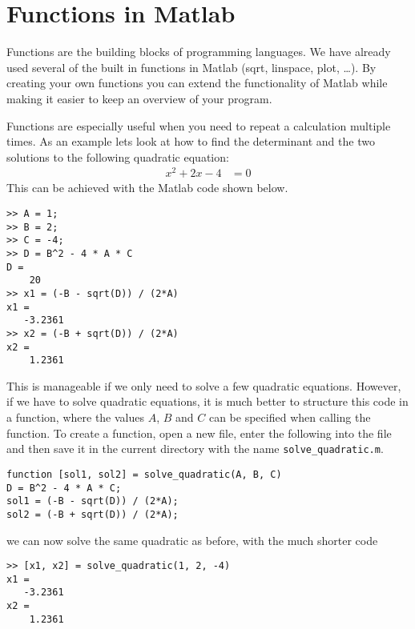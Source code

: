 \section{Functions in Matlab}


Functions are the building blocks of programming languages.
We have already used several of the built in functions 
in Matlab (sqrt, linspace, plot, \ldots). 
By creating your own functions you can extend the functionality of 
Matlab while making it easier to keep an overview of your program.

Functions are especially useful when you need to repeat a calculation 
multiple times.
As an example lets look at how to find the determinant and the two solutions 
to the following quadratic equation: 
\begin{align*}
x^2 + 2x - 4 &= 0 
\end{align*}
This can be achieved with the Matlab code shown below.
\begin{lstlisting}
>> A = 1; 
>> B = 2; 
>> C = -4;
>> D = B^2 - 4 * A * C
D =
    20
>> x1 = (-B - sqrt(D)) / (2*A)
x1 =
   -3.2361
>> x2 = (-B + sqrt(D)) / (2*A)
x2 =
    1.2361
\end{lstlisting}
This is manageable if we only need to solve a few quadratic equations.
However, if we have to solve quadratic equations, it is much better to 
structure this code in a function, where the values $A$, $B$ and $C$ can be 
specified when calling the function.
To create a function, open a new file, enter the following into the file 
and then save it in the current directory with the name 
\verb!solve_quadratic.m!.
\begin{lstlisting}
function [sol1, sol2] = solve_quadratic(A, B, C)
D = B^2 - 4 * A * C;
sol1 = (-B - sqrt(D)) / (2*A);
sol2 = (-B + sqrt(D)) / (2*A);
\end{lstlisting}
we can now solve the same quadratic as before, with the much shorter code
\begin{lstlisting}
>> [x1, x2] = solve_quadratic(1, 2, -4)
x1 =
   -3.2361
x2 =
    1.2361
\end{lstlisting}

